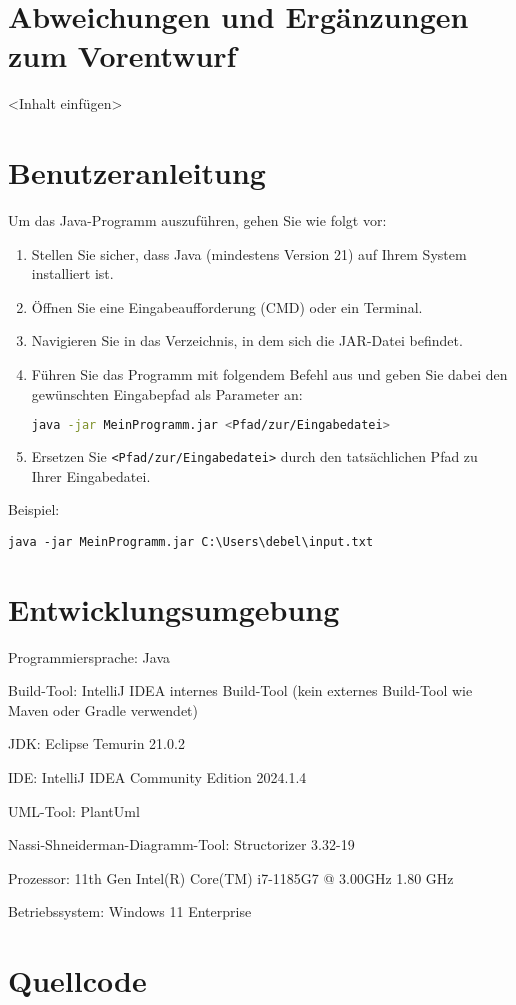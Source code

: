 \documentclass[a4paper,12pt]{report}
\begin{document}
\chapter{Abweichungen und Ergänzungen zum Vorentwurf}
<Inhalt einfügen>

\chapter{Benutzeranleitung}

Um das Java-Programm auszuführen, gehen Sie wie folgt vor:

\begin{enumerate}
    \item Stellen Sie sicher, dass Java (mindestens Version 21) auf Ihrem System installiert ist.
    \item Öffnen Sie eine Eingabeaufforderung (CMD) oder ein Terminal.
    \item Navigieren Sie in das Verzeichnis, in dem sich die JAR-Datei befindet.
    \item Führen Sie das Programm mit folgendem Befehl aus und geben Sie dabei den gewünschten Eingabepfad als Parameter an:
    \begin{lstlisting}[language=bash]
    java -jar MeinProgramm.jar <Pfad/zur/Eingabedatei>
    \end{lstlisting}
    \item Ersetzen Sie \texttt{<Pfad/zur/Eingabedatei>} durch den tatsächlichen Pfad zu Ihrer Eingabedatei.
\end{enumerate}

Beispiel:


\texttt{java -jar MeinProgramm.jar C:\textbackslash Users\textbackslash debel\textbackslash input.txt}



\chapter{Entwicklungsumgebung}
Programmiersprache: Java

Build-Tool: IntelliJ IDEA internes Build-Tool (kein externes Build-Tool wie Maven oder Gradle verwendet)

JDK: Eclipse Temurin 21.0.2

IDE: IntelliJ IDEA Community Edition 2024.1.4

UML-Tool: PlantUml

Nassi-Shneiderman-Diagramm-Tool: Structorizer 3.32-19

Prozessor: 11th Gen Intel(R) Core(TM) i7-1185G7 @ 3.00GHz   1.80 GHz 

Betriebssystem: Windows 11 Enterprise

\chapter{Quellcode}

\end{document}
